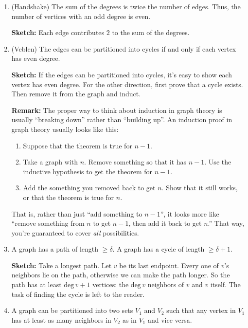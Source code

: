 \documentclass[11pt,paper=letter]{scrartcl}
\begin{document}
\begin{enumerate}
  \item (Handshake) The sum of the degrees is twice the number of edges. Thus, the number of vertices with an odd degree is even.

  \textbf{Sketch:} Each edge contributes $2$ to the sum of the degrees.
  \item (Veblen) The edges can be partitioned into cycles if and only if each vertex has even degree.

  \textbf{Sketch:} If the edges can be partitioned into cycles, it's easy to show each vertex has even degree. For the other direction, first prove that a cycle exists. Then remove it from the graph and induct.

  \textbf{Remark:} The proper way to think about induction in graph theory is usually ``breaking down'' rather than ``building up''. An induction proof in graph theory usually looks like this:
  \begin{enumerate}
    \item Suppose that the theorem is true for $n-1$.
    \item Take a graph with $n$. Remove something so that it has $n-1$. Use the inductive hypothesis to get the theorem for $n-1$.
    \item Add the something you removed back to get $n$. Show that it still works, or that the theorem is true for $n$.
  \end{enumerate}
  That is, rather than just ``add something to $n-1$'', it looks more like ``remove something from $n$ to get $n-1$, then add it back to get $n$.'' That way, you're guaranteed to cover \emph{all} possibilities.

  \item A graph has a path of length $\geq \delta$. A graph has a cycle of length $\geq \delta + 1$.

  \textbf{Sketch:} Take a longest path. Let $v$ be its last endpoint. Every one of $v$'s neighbors lie on the path, otherwise we can make the path longer. So the path has at least $\text{deg}\,v + 1$ vertices: the $\text{deg}\,v$ neighbors of $v$ and $v$ itself. The task of finding the cycle is left to the reader.

  \item A graph can be partitioned into two sets $V_1$ and $V_2$ such that any vertex in $V_1$ has at least as many neighbors in $V_2$ as in $V_1$ and vice versa. %


\end{enumerate}
\end{document}
